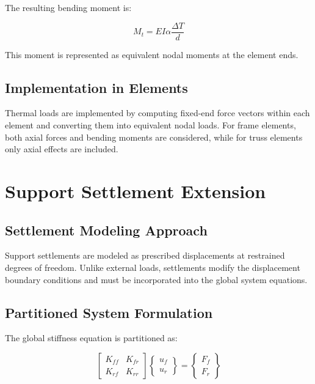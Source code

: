 The resulting bending moment is:

\begin{equation}
M_t = E I \alpha \frac{\Delta T}{d}
\end{equation}

This moment is represented as equivalent nodal moments at the element ends.

\subsection{Implementation in Elements}

Thermal loads are implemented by computing fixed-end force vectors within each element and converting them into equivalent nodal loads. For frame elements, both axial forces and bending moments are considered, while for truss elements only axial effects are included.
\pagebreak
\section{Support Settlement Extension}

\subsection{Settlement Modeling Approach}

Support settlements are modeled as prescribed displacements at restrained degrees of freedom. Unlike external loads, settlements modify the displacement boundary conditions and must be incorporated into the global system equations.

\subsection{Partitioned System Formulation}

The global stiffness equation is partitioned as:

\begin{equation}
\begin{bmatrix}
K_{ff} & K_{fr} \\
K_{rf} & K_{rr}
\end{bmatrix}
\begin{Bmatrix}
u_f \\
u_r
\end{Bmatrix}
=
\begin{Bmatrix}
F_f \\
F_r
\end{Bmatrix}
\end{equation}

